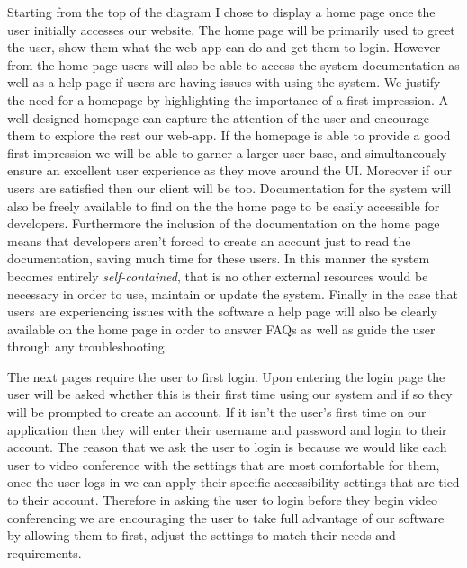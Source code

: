 Starting from the top of the diagram I chose to display a
home page once the user initially accesses our website. The
home page will be primarily used to greet the user, show them
what the web-app can do and get them to login. However from
the home page users will also be able to access the system
documentation as well as a help page if users are having issues
with using the system. We justify the need for a homepage by
highlighting the importance of a first impression. A
well-designed homepage can capture the attention of the user
and encourage them to explore the rest our web-app. If the
homepage is able to provide a good first impression we will be
able to garner a larger user base, and simultaneously ensure an
excellent user experience as they move around the UI. Moreover
if our users are satisfied then our client will be too.
Documentation for the system will also be freely available to
find on the the home page to be easily accessible for
developers. Furthermore the inclusion of the documentation
on the home page means that developers aren't forced to create
an account just to read the documentation, saving much time for
these users. In this manner the system becomes entirely
\textit{self-contained}, that is no other external resources
would be necessary in order to use, maintain or update the
system. Finally in the case that users are experiencing issues
with the software a help page will also be clearly available on
the home page in order to answer FAQs as well as guide the user
through any troubleshooting. \\ \vspace{0.2cm}

The next pages require the user to first login. Upon entering
the login page the user will be asked whether this is their
first time using our system and if so they will be prompted to
create an account. If it isn't the user's first time on our
application then they will enter their username and password
and login to their account. The reason that we ask the user to
login is because we would like each user to video conference
with the settings that are most comfortable for them, once the
user logs in we can apply their specific accessibility
settings that are tied to their account. Therefore in asking
the user to login before they begin video conferencing we are
encouraging the user to take full advantage of our software by
allowing them to first, adjust the settings to match their
needs and requirements. \\ \vspace{0.2cm}


